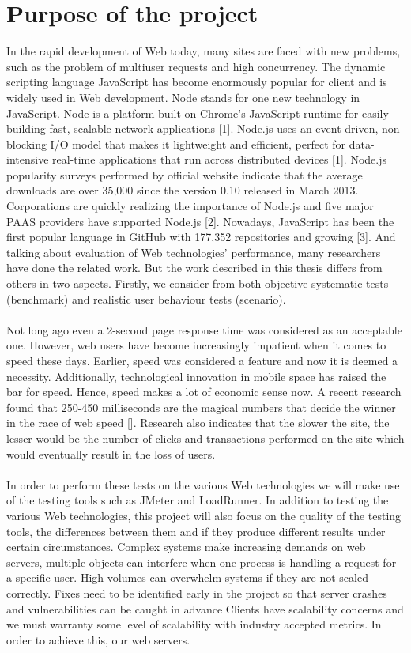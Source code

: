 \documentclass[thesis.tex]{subfiles}
\begin{document}
\section{Purpose of the project}
In the rapid development of Web today, many sites are faced with new problems, such as the problem of multiuser requests and high concurrency. The dynamic scripting language JavaScript has become enormously popular for client and is widely used in Web development. Node stands for one new technology in JavaScript. Node is a platform built on Chrome's JavaScript runtime for easily building fast, scalable network applications [1]. Node.js uses an event-driven, non- blocking I/O model that makes it lightweight and efficient, perfect for data-intensive real-time applications that run across distributed devices [1]. Node.js popularity surveys performed by official website indicate that the average downloads are over 35,000 since the version 0.10 released in March 2013. Corporations are quickly realizing the importance of Node.js and five major PAAS providers have supported Node.js [2]. Nowadays, JavaScript has been the first popular language in GitHub with 177,352 repositories and growing [3]. And talking about evaluation of Web technologies’ performance, many researchers have done the related work. But the work described in this thesis differs from others in two aspects. Firstly, we consider from both objective systematic tests (benchmark) and realistic user behaviour tests (scenario).
\paragraph{}
Not long ago even a 2-second page response time was considered as an acceptable one. However, web users have become increasingly impatient when it comes to speed these days. Earlier, speed was considered a feature and now it is deemed a necessity. Additionally, technological innovation in mobile space has raised the bar for speed. Hence, speed makes a lot of economic sense now. A recent research found that 250-450 milliseconds are the magical numbers that decide the winner in the race of web speed []. Research also indicates that the slower the site, the lesser would be the number of clicks and transactions performed on the site which would eventually result in the loss of users.
\paragraph{}
In order to perform these tests on the various Web technologies we will make use of the testing tools such as JMeter and LoadRunner. In addition to testing the various Web technologies, this project will also focus on the quality of the testing tools, the differences between them and if they produce different results under certain circumstances. Complex systems make increasing demands on web servers, multiple objects can interfere when one process is handling a request for a specific user. High volumes can overwhelm systems if they are not scaled correctly. Fixes need to be identified early in the project so that server crashes and vulnerabilities can be caught in advance Clients have scalability concerns and we must warranty some level of scalability with industry accepted metrics. In order to achieve this, our web servers.
\end{document}
